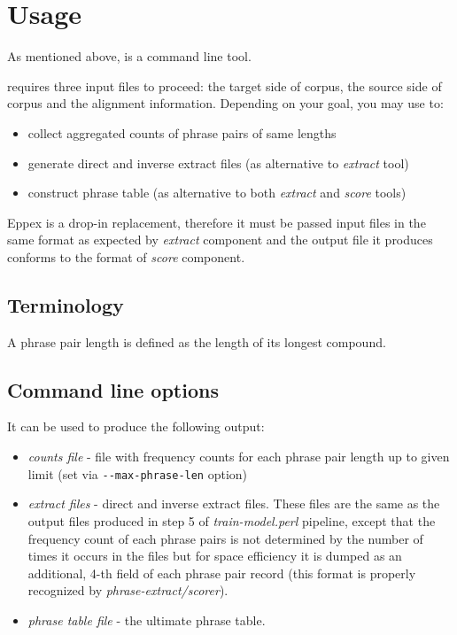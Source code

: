 
\chapter{Usage}
\label{chap:usage}

As mentioned above, \eppex{} is a command line tool.

\Eppex{} requires three input files to proceed:
the target side of corpus, the source side of corpus and the alignment information.
Depending on your goal, you may use \eppex{} to:
\begin{itemize}
 \item collect aggregated counts of phrase pairs of same lengths
 \item generate direct and inverse extract files (as alternative to \emph{extract} tool)
 \item construct phrase table (as alternative to both \emph{extract} and \emph{score} tools)
\end{itemize}

Eppex is a drop-in replacement, therefore it must be passed input files
in the same format as expected by \emph{extract} component and
the output file it produces conforms to the format of \emph{score} component.

\section{Terminology}


A phrase pair length is defined as the length of its longest compound.

\section{Command line options}

It can be used to produce the following output:
\begin{itemize}
 \item \emph{counts file} - file with frequency counts for each phrase pair
  length up to given limit (set via \verb|--max-phrase-len| option)
 \item \emph{extract files} - direct and inverse extract files. These files are the
  same as the output files produced in step 5 of \emph{train-model.perl} pipeline,
  except that the frequency count of each phrase pairs is not determined by
  the number of times it occurs in the files but for space efficiency it is
  dumped as an additional, 4-th field of each phrase pair record (this format
  is properly recognized by \emph{phrase-extract/scorer}).
 \item \emph{phrase table file} - the ultimate phrase table.
\end{itemize}

